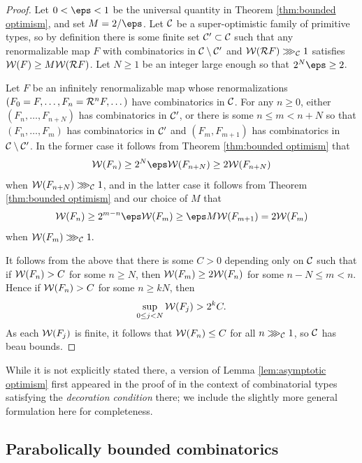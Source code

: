 \documentclass[12pt]{amsart}
\begin{document}
\begin{proof}
	Let $0<\eps<1$ be the universal quantity in Theorem \ref{thm:bounded optimism}, and set $M = 2/\eps$. Let $\mathcal C$ be a super-optimistic family of primitive types, so by definition there is some finite set $\mathcal C'\subset \mathcal C$ such that any renormalizable \pql map $F$ with combinatorics in $\mathcal C\setminus \mathcal C'$ and $\mathcal W(\mathcal R F)\ggg_{\mathcal C} 1$ satisfies $\mathcal W(F)\geq M\mathcal W(\mathcal R F)$. 
	Let $N\geq 1$ be an integer large enough so that $2^N\eps \geq 2$.
	
	Let $F$ be an infinitely renormalizable \pql map whose renormalizations $(F_0 = F, \dots, F_n=\mathcal R^nF, \dots)$ have combinatorics in $\mathcal C$.
	For any $n\geq 0$, either  $(F_n, \dots, F_{n+N})$ has combinatorics in $\mathcal C'$, or there is some $n\leq  m < n+N$
	so that $(F_n, \dots, F_{m})$ has combinatorics in 
	$\mathcal C'$ and $(F_{m}, F_{m+1})$ has combinatorics in $\mathcal C\setminus \mathcal C'$. 
	In the former case it follows from Theorem \ref{thm:bounded optimism} that $$\WW(F_n)\geq 2^N\eps\WW(F_{n+N})\geq 2\WW(F_{n+N})$$ 
	when $\mathcal W(F_{n+N})\ggg_{\mathcal C} 1$, and in the latter case it follows from Theorem \ref{thm:bounded optimism} and our choice of $M$ that $$\WW(F_n)\geq 2^{m-n}\eps\WW(F_m)\geq \eps M\WW(F_{m+1})= 2\WW(F_m)$$
	when $\mathcal W(F_m)\ggg_{\mathcal C} 1.$
	
	
	It follows from the above that there is some $C>0$ depending only on $\mathcal C$ such that if $\mathcal W(F_n)> C$ for some $n\geq N$, then $\mathcal W(F_m)\geq 2\mathcal W(F_n)$ for some $n-N\leq m < n$. Hence if $\mathcal W(F_n)> C$ for some $n\geq kN$, then $$\sup_{0\leq j < N}\mathcal W(F_j)>2^kC.$$
	As each $\mathcal W(F_j)$ is finite, it follows that $\mathcal W(F_n)\leq C$ for all $n\ggg_{\mathcal C} 1$, so $\mathcal C$ has beau bounds.
\end{proof}

\begin{rem}
    While it is not explicitly stated there, a version of Lemma \ref{lem:asymptotic optimism} first appeared in the proof of \cite[Corollary 5.17]{KL:decorations} in the context of combinatorial types satisfying the \emph{decoration condition} there; we include the slightly more general formulation here for completeness.
\end{rem}

\subsection{Parabolically bounded combinatorics}
\end{document}
